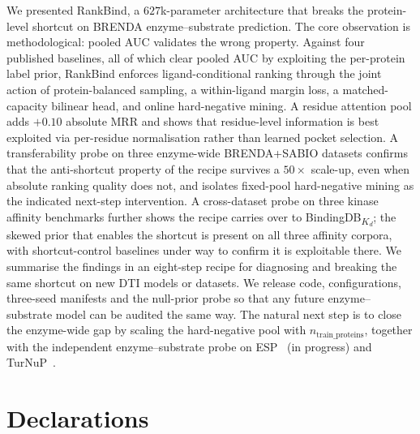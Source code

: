 \documentclass[11pt,a4paper]{article}
\newcommand{\method}{RankBind\xspace}
\begin{document}
We presented \method, a $627$k-parameter architecture that breaks the
protein-level shortcut on BRENDA enzyme--substrate prediction. The
core observation is methodological: pooled AUC validates the wrong
property. Against four published baselines, all of which clear pooled
AUC by exploiting the per-protein label prior, \method enforces
ligand-conditional ranking through the joint action of
protein-balanced sampling, a within-ligand margin loss, a
matched-capacity bilinear head, and online hard-negative mining. A
residue attention pool adds $+0.10$ absolute MRR and shows that
residue-level information is best exploited via per-residue
normalisation rather than learned pocket selection. A transferability
probe on three enzyme-wide BRENDA+SABIO datasets confirms that the
anti-shortcut property of the recipe survives a $50\times$ scale-up,
even when absolute ranking quality does not, and isolates
fixed-pool hard-negative mining as the indicated next-step
intervention. A cross-dataset probe on three kinase affinity
benchmarks further shows the recipe carries over to
BindingDB\textsubscript{$K_d$}; the skewed prior that enables the
shortcut is present on all three affinity corpora, with shortcut-control
baselines under way to confirm it is exploitable there. We summarise the
findings in an eight-step recipe for diagnosing and breaking the same
shortcut on new DTI models or datasets. We release code,
configurations, three-seed manifests and the null-prior probe so that
any future enzyme--substrate model can be audited the same way. The
natural next step is to close the enzyme-wide gap by scaling the
hard-negative pool with $n_{\text{train\_proteins}}$, together with the
independent enzyme--substrate probe on ESP~\citep{kroll2023esp} (in
progress) and TurNuP~\citep{kroll2023turnup}.

\section*{Declarations}
\end{document}
